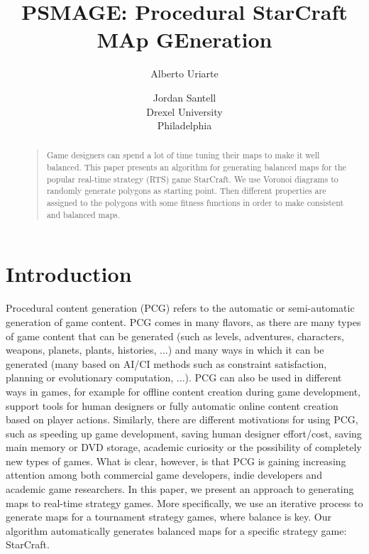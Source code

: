 \documentclass[letterpaper]{article}
\begin{document}
%
\title{PSMAGE: Procedural StarCraft MAp GEneration}
\author{Alberto Uriarte \and Jordan Santell\\
Drexel University\\
Philadelphia\\
}
\maketitle
\begin{abstract}
\begin{quote}
Game designers can spend a lot of time tuning their maps to make it well balanced. This paper presents an algorithm for generating balanced maps for the popular real-time strategy (RTS) game StarCraft. We use Voronoi diagrams to randomly generate polygons as starting point. Then different properties are assigned to the polygons with some fitness functions in order to make consistent and balanced maps.
\end{quote}
\end{abstract}


\section{Introduction} %
\label{sec:introduction}
Procedural content generation (PCG) refers to the automatic or semi-automatic generation of game content. PCG comes in many ﬂavors, as there are many types of game content that can be generated (such as levels, adventures, characters, weapons, planets, plants, histories, ...) and many ways in which it can be generated (many based on AI/CI methods such as constraint satisfaction, planning or evolutionary computation, ...). PCG can also be used in different ways in games, for example for offline content creation during game development, support tools for human designers or fully automatic online content creation based on player actions. Similarly, there are different motivations for using PCG, such as speeding up game development, saving human designer effort/cost, saving main memory or DVD storage, academic curiosity or the possibility of completely new types of games. What is clear, however, is that PCG is gaining increasing attention among both commercial game developers, indie developers and academic game researchers.
In this paper, we present an approach to generating maps to real-time strategy games. More speciﬁcally, we use an iterative process to generate maps for a tournament strategy games, where balance is key. Our algorithm automatically generates balanced maps for a specific strategy game: StarCraft.
\end{document}

